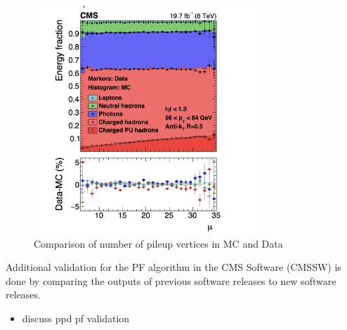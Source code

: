\begin{figure}[h]
\centering
\includegraphics[width=0.75\textwidth]{figures/pfvalidation_mu_replace}
\caption{Comparison of number of pileup vertices in MC and Data~\cite{CMS-PRF-14-001}}
\label{fig:pfval_mu}
\end{figure}

Additional validation for the PF algorithm in the CMS Software (CMSSW) is done by comparing the outputs of previous software releases to new software releases.

\begin{itemize}
	\item discuss ppd pf validation
\end{itemize}



